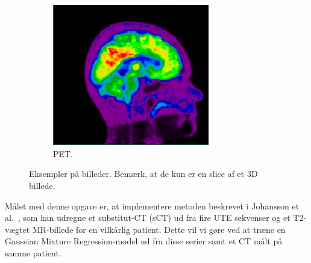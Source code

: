 \begin{figure}[H]
\begin{subfigure}{0.3\textwidth}
        \includegraphics[width=0.75\textwidth]{billeder/pet.png}
        \caption{PET.}
        \label{eksempel:pet}
    \end{subfigure}\hfill
    \caption{Eksempler på billeder. Bemærk, at de kun er en slice af et 3D billede.}
    \label{eksempel}
\end{figure}


Målet med denne opgave er, at implementere metoden beskrevet i
Johansson et al.~\cite{johansson}, som kan udregne et substitut-CT (sCT)
ud fra fire UTE sekvenser og et T2-vægtet MR-billede for en vilkårlig
patient. Dette vil vi gøre ved at træne en Gaussian Mixture Regression-model ud fra disse serier samt et CT målt på samme patient.
